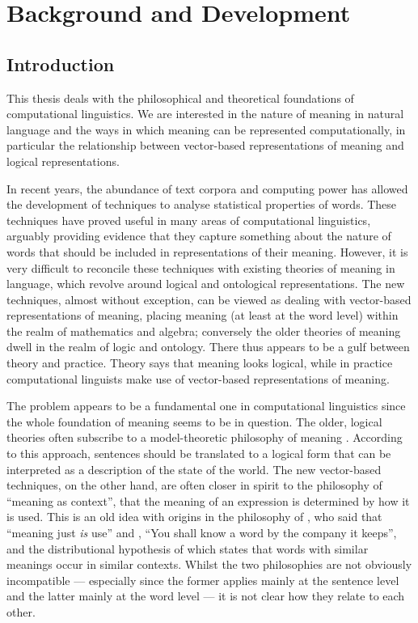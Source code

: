 
%

%

\part{Background and Development}
\chapter{Introduction}

This thesis deals with the philosophical and theoretical foundations of computational linguistics. We are interested in the nature of meaning in natural language and the ways in which meaning can be represented computationally, in particular the relationship between vector-based representations of meaning and logical representations.

In recent years, the abundance of text corpora and computing power has allowed the development of techniques to analyse statistical properties of words. These techniques have proved useful in many areas of computational linguistics, arguably providing evidence that they capture something about the nature of words that should be included in representations of their meaning. However, it is very difficult to reconcile these techniques with existing theories of meaning in language, which revolve around logical and ontological representations. The new techniques, almost without exception, can be viewed as dealing with vector-based representations of meaning, placing meaning (at least at the word level) within the realm of mathematics and algebra; conversely the older theories of meaning dwell in the realm of logic and ontology. There thus appears to be a gulf between theory and practice. Theory says that meaning looks logical, while in practice computational linguists make use of vector-based representations of meaning.

The problem appears to be a fundamental one in computational linguistics since the whole foundation of meaning seems to be in question. The older, logical theories often subscribe to a model-theoretic philosophy of meaning \citep{Kamp:93, Blackburn:05}. According to this approach, sentences should be translated to a logical form that can be interpreted as a description of the state of the world. The new vector-based techniques, on the other hand, are often closer in spirit to the philosophy of ``meaning as context'', that the meaning of an expression is determined by how it is used. This is an old idea with origins in the philosophy of \cite{Wittgenstein:53}, who said that ``meaning just \emph{is} use'' and \cite{Firth:57}, ``You shall know a word by the company it keeps'', and the distributional hypothesis of \cite{Harris:68} which states that words with similar meanings occur in similar contexts. Whilst the two philosophies are not obviously incompatible --- especially since the former applies mainly at the sentence level and the latter mainly at the word level --- it is not clear how they relate to each other.


